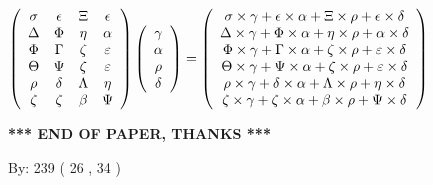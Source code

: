 \documentclass[12pt]{article}
\begin{document}
$  %
 \left( \begin{array}
 {
 c
 c
 c
 c
 }
 \sigma & 
 \epsilon & 
                    \Xi & 
 \epsilon \\ 
 \Delta & 
 \Phi & 
 \eta & 
 \alpha \\ 
 \Phi & 
 \Gamma & 
                    \zeta & 
 \varepsilon \\ 
 \Theta & 
 \Psi & 
                    \zeta & 
 \varepsilon \\ 
 \rho & 
 \delta & 
 \Lambda & 
 \eta \\ 
                    \zeta & 
                    \zeta & 
 \beta & 
 \Psi
 \end{array} \right)
 \left( \begin{array}
 {
 c
 }
 \gamma \\ 
 \alpha \\ 
 \rho \\ 
 \delta
 \end{array} \right)
=
 \left( \begin{array}
 {
 c
 }
  \sigma \times  \gamma +  \epsilon \times  \alpha +                     \Xi \times  \rho +  \epsilon \times  \delta \\ 
  \Delta \times  \gamma +  \Phi \times  \alpha +  \eta \times  \rho +  \alpha \times  \delta \\ 
  \Phi \times  \gamma +  \Gamma \times  \alpha +                     \zeta \times  \rho +  \varepsilon \times  \delta \\ 
  \Theta \times  \gamma +  \Psi \times  \alpha +                     \zeta \times  \rho +  \varepsilon \times  \delta \\ 
  \rho \times  \gamma +  \delta \times  \alpha +  \Lambda \times  \rho +  \eta \times  \delta \\ 
                     \zeta \times  \gamma +                     \zeta \times  \alpha +  \beta \times  \rho +  \Psi \times  \delta
 \end{array} \right)
$
 
 
 
   
   
 \vspace{0.2in}
 
   
   
   
   
\vspace{1.0in} 
{\textbf{\large{ *** END OF PAPER, THANKS *** }}} 
   
   
\hspace{1.0in} By: 
         239 (          26 ,           34 )
   
\end{document}
